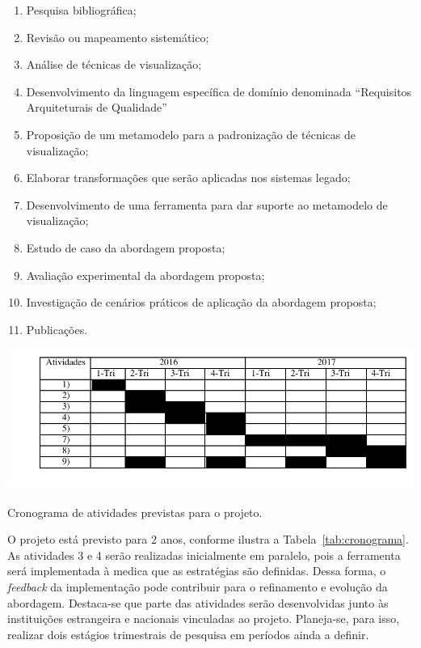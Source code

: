 \documentclass[12pt]{article}
\begin{document}
\begin{enumerate}
    \item Pesquisa bibliográfica;
    \item Revisão ou mapeamento sistemático;
    \item Análise de técnicas de visualização;
    \item Desenvolvimento da linguagem específica de domínio denominada ``Requisitos Arquiteturais de Qualidade''
    \item Proposição de um metamodelo para a padronização de técnicas de visualização;
    \item Elaborar transformações que serão aplicadas nos sistemas legado;
    \item Desenvolvimento de uma ferramenta para dar suporte ao metamodelo de visualização;
    \item Estudo de caso da abordagem proposta;
    \item Avaliação experimental da abordagem proposta;
    \item Investigação de cenários práticos de aplicação da abordagem proposta;
    \item Publicações.
\end{enumerate}

\begin{table}[h]
 \centering
 \includegraphics[scale=1]{tabela_pos_doc_f.pdf}
 \caption{Cronograma de atividades previstas para o projeto.\label{tab:cronograma}}
\end{table}

O projeto está previsto para 2 anos, conforme ilustra a Tabela~\ref{tab:cronograma}. As atividades 3 e 4 serão realizadas inicialmente em paralelo, pois a ferramenta será implementada à medica que as estratégias são definidas. Dessa forma, o \textit{feedback} da implementação pode contribuir para o refinamento e evolução da abordagem.
Destaca-se que parte das atividades serão desenvolvidas junto às instituições estrangeira e nacionais vinculadas ao projeto. Planeja-se, para isso, realizar dois estágios trimestrais de pesquisa em períodos ainda a definir. 
\end{document}

